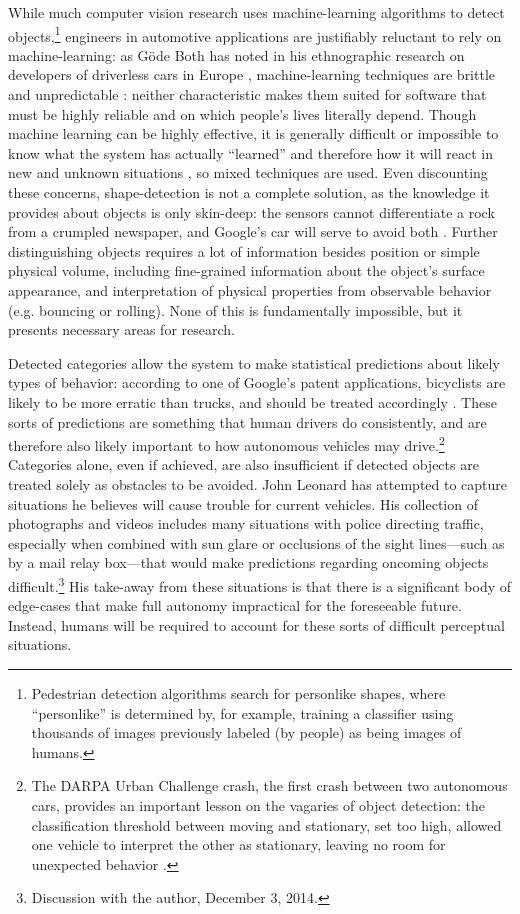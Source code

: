 While much computer vision research uses machine-learning algorithms to detect
objects,\footnote{Pedestrian detection algorithms search for
  personlike shapes, where ``personlike'' is determined by, for
  example, training a classifier using thousands of images previously
  labeled (by people) as being images of humans.} engineers in
automotive applications are justifiably 
reluctant to rely on machine-learning: as G\"{o}de Both has noted in his
ethnographic research on developers of driverless cars in
Europe \cite{bothpt1},
machine-learning techniques are brittle and unpredictable \cite{bothpt2}: neither
characteristic makes them suited for software that must be highly
reliable and on which people's lives literally depend. Though machine
learning can be highly effective, it is generally difficult or
impossible to know what the 
system has actually ``learned'' and therefore how it will react in new
and unknown situations \cite{bothpt2}, so mixed techniques are used.
Even discounting these concerns, shape-detection is not a complete
solution, as the knowledge it provides about objects is only
skin-deep: the sensors cannot differentiate a rock from a crumpled
newspaper, and Google's car will serve to avoid
both \cite{gomesCircles}. Further distinguishing objects requires a lot
of information besides position or simple physical volume,
including fine-grained information about the object's surface
appearance, and interpretation of physical properties from observable
behavior (e.g. bouncing or rolling). None of this is fundamentally
impossible, but it presents necessary areas for research.

Detected categories allow the system to make
statistical predictions about likely types of behavior: according to
one of Google's patent applications, bicyclists are likely to be more
erratic than trucks, and should be treated
accordingly \cite{predictPatent}. These sorts of predictions are
something that human drivers do consistently, and are therefore also
likely important to how autonomous vehicles may drive.\footnote{The
  DARPA Urban Challenge crash, the first crash between two autonomous
  cars, provides an important lesson on the vagaries of object
  detection: the classification threshold between moving and
  stationary, set too high, allowed one vehicle to interpret the other
  as stationary, leaving no room for unexpected behavior \cite{collisionPaper}.}
Categories alone, even if achieved, are also insufficient if detected
objects are treated solely as obstacles to be avoided. John Leonard
has attempted to capture situations he believes will cause
trouble for current vehicles. His collection of photographs and videos
includes many situations with police 
directing traffic, especially when combined with sun glare or
occlusions of the sight lines---such as by a mail relay box---that
would make predictions regarding oncoming 
objects difficult.\footnote{Discussion with the author, December 3,
  2014.} His take-away from these situations is that there 
is a significant body of edge-cases that make full autonomy
impractical for the foreseeable future. Instead, humans will be
required to account for these sorts of difficult perceptual situations. 

